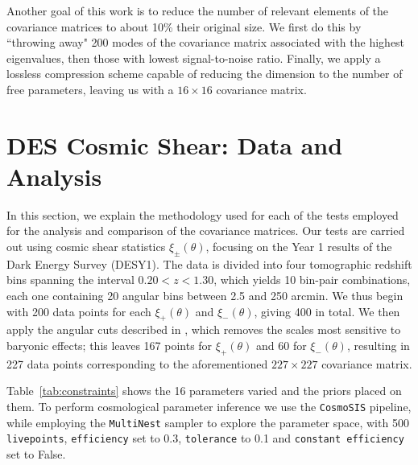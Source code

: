 \documentclass[twocolumn]{\docclass}
\begin{document}
	Another goal of this work is to reduce the number of relevant elements of the covariance matrices to about 10\% their original size. We first do this by ``throwing away" 200 modes of the covariance matrix associated with the highest eigenvalues, then those with lowest signal-to-noise ratio. Finally, we apply a lossless compression scheme capable of reducing the dimension to the number of free parameters, leaving us with a $16 \times 16$ covariance matrix.
	
	\section{DES Cosmic Shear: Data and Analysis}
	\label{sec:methods}
	
	In this section, we explain the methodology used for each of the tests employed for the analysis and comparison of the covariance matrices. Our tests are carried out using cosmic shear statistics $\xi_\pm(\theta)$, focusing on the Year 1 results of the Dark Energy Survey \citep{Troxel:2017xyo,Abbott:2018cms} (DESY1). The data is divided into four tomographic redshift bins spanning the interval $0.20 < z < 1.30$, which yields 10 bin-pair combinations, each one containing 20 angular bins between 2.5 and 250 arcmin. We thus begin with 200 data points for each $\xi_+(\theta)$ and $\xi_-(\theta)$, giving 400 in total. We then apply the angular cuts described in \citep{Abbott:2018cms}, which removes the scales most sensitive to baryonic effects; this leaves 167 points for $\xi_+(\theta)$ and 60 for $\xi_-(\theta)$, resulting in 227 data points corresponding to the aforementioned $227 \times 227$ covariance matrix. 
	
	Table~\ref{tab:constraints} shows the 16 parameters varied and the priors placed on them. To perform cosmological parameter inference we use the {\tt CosmoSIS} \citep{Zuntz:2015med, Lewis2000taj, Kirk2012mnras, Kilbinger2009aa, Howlett2012jcap, Bridle2007njp, Takahashi2012taj, Smith2003mnras} pipeline, while employing the {\tt MultiNest} \citep{Feroz:2009fhb} sampler to explore the parameter space, with 500 {\tt livepoints}, {\tt efficiency} set to 0.3, {\tt tolerance} to 0.1 and {\tt constant efficiency} set to False.
	
\end{document}

